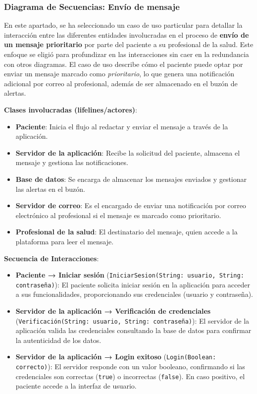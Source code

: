 \documentclass{article}
\begin{document}
\subsubsection{Diagrama de Secuencias: Envío de mensaje}

En este apartado, se ha seleccionado un caso de uso particular para detallar la interacción entre las diferentes entidades involucradas en el proceso de \textbf{envío de un mensaje prioritario} por parte del paciente a su profesional de la salud. Este enfoque se eligió para profundizar en las interacciones sin caer en la redundancia con otros diagramas. El caso de uso describe cómo el paciente puede optar por enviar un mensaje marcado como \textit{prioritario}, lo que genera una notificación adicional por correo al profesional, además de ser almacenado en el buzón de alertas.

\textbf{Clases involucradas (lifelines/actores)}:
\begin{itemize}
	\item \textbf{Paciente}: Inicia el flujo al redactar y enviar el mensaje a través de la aplicación.
	\item \textbf{Servidor de la aplicación}: Recibe la solicitud del paciente, almacena el mensaje y gestiona las notificaciones.
	\item \textbf{Base de datos}: Se encarga de almacenar los mensajes enviados y gestionar las alertas en el buzón.
	\item \textbf{Servidor de correo}: Es el encargado de enviar una notificación por correo electrónico al profesional si el mensaje es marcado como prioritario.
	\item \textbf{Profesional de la salud}: El destinatario del mensaje, quien accede a la plataforma para leer el mensaje.
\end{itemize}

\textbf{Secuencia de Interacciones}:
\begin{itemize}
	\item \textbf{Paciente → Iniciar sesión} (\texttt{IniciarSesion(String: usuario, String: contraseña)}): El paciente solicita iniciar sesión en la aplicación para acceder a sus funcionalidades, proporcionando sus credenciales (usuario y contraseña).
	\item \textbf{Servidor de la aplicación → Verificación de credenciales} (\texttt{Verificación(String: usuario, String: contraseña)}): El servidor de la aplicación valida las credenciales consultando la base de datos para confirmar la autenticidad de los datos.
	\item \textbf{Servidor de la aplicación → Login exitoso} (\texttt{Login(Boolean: correcto)}): El servidor responde con un valor booleano, confirmando si las credenciales son correctas (\texttt{true}) o incorrectas (\texttt{false}). En caso positivo, el paciente accede a la interfaz de usuario.
\end{itemize}
\end{document}
